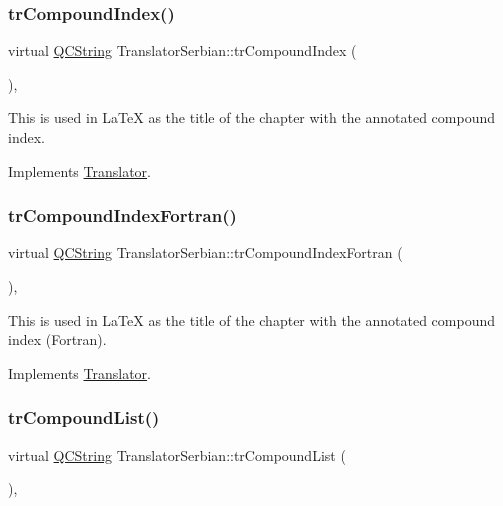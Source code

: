 \subsubsection{\texorpdfstring{trCompoundIndex()}{trCompoundIndex()}}
{\footnotesize\ttfamily virtual \mbox{\hyperlink{class_q_c_string}{Q\+C\+String}} Translator\+Serbian\+::tr\+Compound\+Index (\begin{DoxyParamCaption}{ }\end{DoxyParamCaption})\hspace{0.3cm}{\ttfamily [inline]}, {\ttfamily [virtual]}}

This is used in La\+TeX as the title of the chapter with the annotated compound index. 

Implements \mbox{\hyperlink{class_translator}{Translator}}.

\mbox{\label{class_translator_serbian_aa467076d504aa1430a579f2a045a44e9}} 
\subsubsection{\texorpdfstring{trCompoundIndexFortran()}{trCompoundIndexFortran()}}
{\footnotesize\ttfamily virtual \mbox{\hyperlink{class_q_c_string}{Q\+C\+String}} Translator\+Serbian\+::tr\+Compound\+Index\+Fortran (\begin{DoxyParamCaption}{ }\end{DoxyParamCaption})\hspace{0.3cm}{\ttfamily [inline]}, {\ttfamily [virtual]}}

This is used in La\+TeX as the title of the chapter with the annotated compound index (Fortran). 

Implements \mbox{\hyperlink{class_translator}{Translator}}.

\mbox{\label{class_translator_serbian_a6b1333299763c0eba7d2ddddf40092b1}} 
\subsubsection{\texorpdfstring{trCompoundList()}{trCompoundList()}}
{\footnotesize\ttfamily virtual \mbox{\hyperlink{class_q_c_string}{Q\+C\+String}} Translator\+Serbian\+::tr\+Compound\+List (\begin{DoxyParamCaption}{ }\end{DoxyParamCaption})\hspace{0.3cm}{\ttfamily [inline]}, {\ttfamily [virtual]}}

